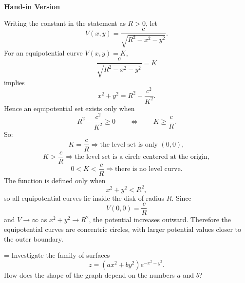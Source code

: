 \documentclass[a4paper,12pt,twocolumn]{article}
\newlength{\problemnumberwidth}
\newenvironment{solutionbox}{\begin{framed}}{\end{framed}}
\newcommand{\problem}[3]{%
  \Needspace{10\baselineskip}%
  \phantomsection\label{#1}%
  \par\vspace{0.8em}%
  \noindent
  \hangindent=\problemnumberwidth
  \hangafter=1
  \makebox[\problemnumberwidth][l]{\textbf{#2.}}#3\par
}
\begin{document}
\begin{solutionbox}
\textbf{Hand-in Version}

Writing the constant in the statement as \(R>0\), let
\[
V(x,y)=\frac{c}{\sqrt{R^2-x^2-y^2}}.
\]
For an equipotential curve \(V(x,y)=K\),
\[
\frac{c}{\sqrt{R^2-x^2-y^2}}=K
\]
implies
\[
x^2+y^2=R^2-\frac{c^2}{K^2}.
\]
Hence an equipotential set exists only when
\[
R^2-\frac{c^2}{K^2}\ge 0
\qquad\Longleftrightarrow\qquad
K\ge \frac{c}{R}.
\]
So:
\[
K=\frac{c}{R}\Rightarrow \text{the level set is only }(0,0),
\]
\[
K>\frac{c}{R}\Rightarrow \text{the level set is a circle centered at the origin},
\]
\[
0<K<\frac{c}{R}\Rightarrow \text{there is no level curve.}
\]
The function is defined only when
\[
x^2+y^2<R^2,
\]
so all equipotential curves lie inside the disk of radius \(R\). Since
\[
V(0,0)=\frac{c}{R}
\]
and \(V\to\infty\) as \(x^2+y^2\to R^2\), the potential increases outward. Therefore the equipotential curves are concentric circles, with larger potential values closer to the outer boundary.

\begin{center}
\end{center}
\end{solutionbox}

\problem{prob:14-1-78}{78}{Investigate the family of surfaces
\[
z=(ax^2+by^2)e^{-x^2-y^2}.
\]
How does the shape of the graph depend on the numbers \(a\) and \(b\)?}
\end{document}
